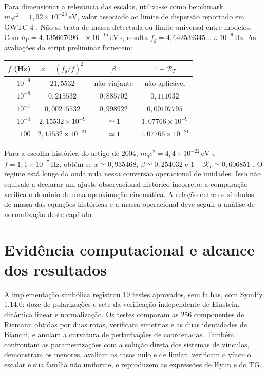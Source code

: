 Para dimensionar a relevância das escalas, utiliza-se como benchmark
\(m_gc^2=1{,}92\times10^{-23}\,\mathrm{eV}\), valor associado ao
limite de dispersão reportado em GWTC-4 \autocite{lvk2026}. Não se
trata de massa detectada ou limite universal entre modelos. Com
\(h_{\mathrm P}=4{,}135667696\ldots\times10^{-15}\,
\mathrm{eV\,s}\), resulta
\(f_g=4{,}642539345\ldots\times10^{-9}\,\mathrm{Hz}\).
As avaliações do script preliminar fornecem:

\begin{center}
\begingroup\small\singlespacing
\setlength{\tabcolsep}{6pt}
\begin{tabular}{@{}rccc@{}}
\toprule
\(f\) (Hz) & \(x=(f_g/f)^2\) & \(\beta\) & \(1-\mathcal R_T\)\\
\midrule
\(10^{-9}\) & \(21{,}5532\) & não viajante & não aplicável\\
\(10^{-8}\) & \(0{,}215532\) & \(0{,}885702\) & \(0{,}111032\)\\
\(10^{-7}\) & \(0{,}00215532\) & \(0{,}998922\) & \(0{,}00107795\)\\
\(10^{-4}\) & \(2{,}15532\times10^{-9}\) & \(\simeq1\) & \(1{,}07766\times10^{-9}\)\\
\(100\) & \(2{,}15532\times10^{-21}\) & \(\simeq1\) & \(1{,}07766\times10^{-21}\)\\
\bottomrule
\end{tabular}
\endgroup
\end{center}

Para a escolha histórica do artigo de 2004,
\(m_gc^2=4{,}4\times10^{-22}\,\mathrm{eV}\) e
\(f=1{,}1\times10^{-7}\,\mathrm{Hz}\), obtêm-se
\(x\simeq0{,}935468\), \(\beta\simeq0{,}254032\) e
\(1-\mathcal R_T\simeq0{,}606851\)
\autocite{depaula2004}. O regime está longe da onda nula nessa
conversão operacional de unidades. Isso não equivale a declarar um
ajuste observacional histórico incorreto: a comparação verifica o
domínio de uma aproximação cinemática. A relação entre os símbolos de
massa das equações históricas e a massa operacional deve seguir a
análise de normalização deste capítulo.

\section{Evidência computacional e alcance dos resultados}

A implementação simbólica registrou 19 testes
aprovados, sem falhas, com SymPy 1.14.0: doze de polarizações e sete
da verificação independente de Einstein, dinâmica linear e normalização. Os testes comparam as 256
componentes de Riemann obtidas por duas rotas, verificam simetrias e
as duas identidades de Bianchi, e anulam a curvatura de perturbações de
coordenadas. Também confrontam as parametrizações com a solução direta
dos sistemas de vínculos, demonstram os menores, avaliam os casos
nulo e de limiar, verificam o vínculo escalar e sua família não
uniforme, e reproduzem as expressões de Hyun e do TG.


